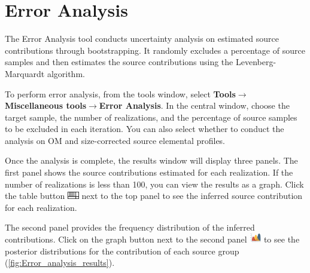 \documentclass[12pt]{report}
\begin{document}
\section{Error Analysis}
The Error Analysis tool conducts uncertainty analysis on estimated source contributions through bootstrapping. It randomly excludes a percentage of source samples and then estimates the source contributions using the Levenberg-Marquardt algorithm. 

To perform error analysis, from the tools window, select \textbf{Tools}$\rightarrow$\textbf{Miscellaneous tools}$\rightarrow$\textbf{Error Analysis}. In the central window, choose the target sample, the number of realizations, and the percentage of source samples to be excluded in each iteration. You can also select whether to conduct the analysis on OM and size-corrected source elemental profiles.

Once the analysis is complete, the results window will display three panels. The first panel shows the source contributions estimated for each realization. If the number of realizations is less than 100, you can view the results as a graph. Click the table button \includegraphics[width=0.5cm]{Figures/table.png} next to the top panel to see the inferred source contribution for each realization.

The second panel provides the frequency distribution of the inferred contributions. Click on the graph button next to the second panel \includegraphics[width=0.5cm]{Figures/Graph.png} to see the posterior distributions for the contribution of each source group (\ref{fig:Error_analysis_results}). 
\end{document}
